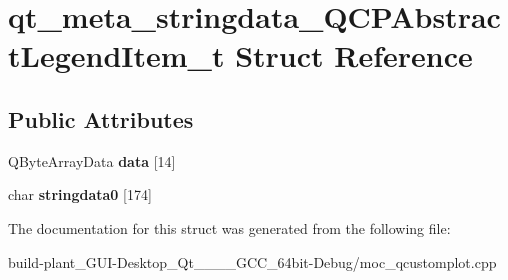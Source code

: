 \hypertarget{structqt__meta__stringdata__QCPAbstractLegendItem__t}{}\section{qt\+\_\+meta\+\_\+stringdata\+\_\+\+Q\+C\+P\+Abstract\+Legend\+Item\+\_\+t Struct Reference}
\label{structqt__meta__stringdata__QCPAbstractLegendItem__t}
\subsection*{Public Attributes}
\begin{DoxyCompactItemize}
\item 
\mbox{\label{structqt__meta__stringdata__QCPAbstractLegendItem__t_afedc8a30b9d66c03673486e9c892c35b}} 
Q\+Byte\+Array\+Data {\bfseries data} \mbox{[}14\mbox{]}
\item 
\mbox{\label{structqt__meta__stringdata__QCPAbstractLegendItem__t_a4987f6d279add0af922402e1f2e28b6b}} 
char {\bfseries stringdata0} \mbox{[}174\mbox{]}
\end{DoxyCompactItemize}


The documentation for this struct was generated from the following file\+:\begin{DoxyCompactItemize}
\item 
build-\/plant\+\_\+\+G\+U\+I-\/\+Desktop\+\_\+\+Qt\+\_\+\_\+\_\+\_\+\+G\+C\+C\+\_\+64bit-\/\+Debug/moc\+\_\+qcustomplot.\+cpp\end{DoxyCompactItemize}
